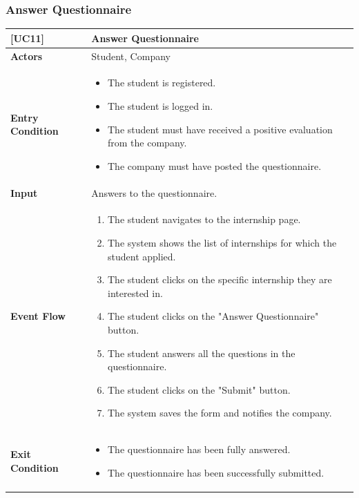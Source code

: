 \subsubsection*{Answer Questionnaire}
\begin{table}[H]
    \centering
    \renewcommand{\arraystretch}{1.5}
    \begin{tabular}{|p{4cm}|p{11cm}|}
    \hline
    \rowcolor{bluepoli!40}
    \textbf{[UC11]} & \textbf{Answer Questionnaire} \\ \hline \hline
    \textbf{Actors} & Student, Company \\ \hline
    \textbf{Entry Condition} & 
    {\setlength{\leftmargini}{1.1em}
    \begin{itemize}
        \item The student is registered.
        \item The student is logged in.
        \item The student must have received a positive evaluation from the company.
        \item The company must have posted the questionnaire.
    \end{itemize}} \\ \hline
    \textbf{Input} & Answers to the questionnaire. \\ \hline
    \textbf{Event Flow} & 
    {\setlength{\leftmargini}{1.4em}
    \begin{enumerate}
        \item The student navigates to the internship page.
        \item The system shows the list of internships for which the student applied.
        \item The student clicks on the specific internship they are interested in.
        \item The student clicks on the "Answer Questionnaire" button.
        \item The student answers all the questions in the questionnaire.
        \item The student clicks on the "Submit" button.
        \item The system saves the form and notifies the company.
    \end{enumerate}} \\ \hline
    \textbf{Exit Condition} & 
    {\setlength{\leftmargini}{1.1em}
    \begin{itemize}
        \item The questionnaire has been fully answered.
        \item The questionnaire has been successfully submitted.

\end{itemize}}
\end{tabular}
\end{table}
